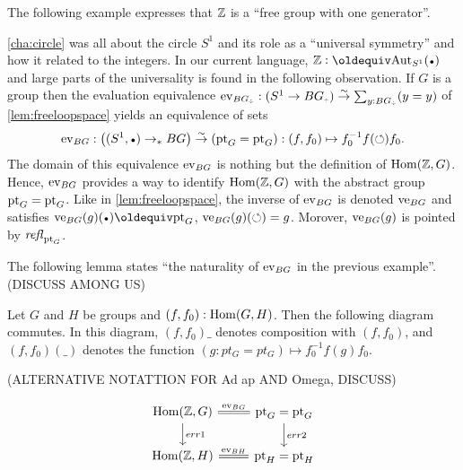 \begin{example}
\end{example}

The following example expresses that $\mathbb{Z}$ is a ``free group with one generator''.

\begin{example}
  \label{ex:Zinitial}
  \cref{cha:circle} was all about the circle $S^1$ and its role as a
  ``universal symmetry'' and how it related to the integers.  In our
  current language, $\ZZ\defequi\aut_{S^1}(\base)$ and large parts of
  the universality is found in the following observation.  If $G$ is a
  group then the evaluation equivalence
  $\ev_{BG_\div}:(S^1\to BG_\div)\we \sum_{y:BG_\div}(y=y)$ of
  \cref{lem:freeloopspace} yields an equivalence of sets
  $$\ev_{BG}:\left((S^1,\base)\ptdto BG\right)\we (\pt_G=\pt_G)
            : (f,f_0)\mapsto f_0^{-1}f(\Sloop)f_0.$$
  The domain of this equivalence $\mathrm{ev}_{BG}$ is nothing but the
  definition of $\mathrm{Hom}(\mathbb{Z},G)$. Hence, $\mathrm{ev}_{BG}$ provides a way to
  identify $\mathrm{Hom}(\mathbb{Z},G)$ with the abstract group $\mathrm{pt}_G=\mathrm{pt}_G$.
Like in \cref{lem:freeloopspace}, the inverse of $\mathrm{ev}_{BG}$
is denoted $\mathrm{ve}_{BG}$ and satisfies $\ve_{BG}(g)(\base)\jdeq\pt_G$, 
$\mathrm{ve}_{BG}(g)(\circlearrowleft)= g$. Morover, $\mathrm{ve}_{BG}(g)$ is pointed by $\mathop{\mathit{refl}_{\mathrm{pt}_G}}$.
\end{example}

The following lemma states ``the naturality of $\mathrm{ev}_{BG}$ in the previous example''.
(DISCUSS AMONG US)

\begin{lemma}\label{lem:Znatural}
Let $G$ and $H$ be groups and $(f,f_0): \mathrm{Hom}(G,H)$.
Then the following diagram commutes. In this diagram,
$(f,f_0)\_$ denotes composition with $(f,f_0)$, and 
$(f,f_0)(\_)$ denotes the function $(g:pt_G = pt_G) \mapsto f_0^{-1} f(g) f_0$.
\end{lemma}
(ALTERNATIVE NOTATTION FOR Ad ap AND Omega, DISCUSS)

\[
\begin{tikzcd} 
\Hom(\ZZ,G) \arrow[r, equal, "\ev_{BG}"] \arrow[d, "err1"] & %
\pt_G = \pt_G \arrow[d, "err2"]\\ %
\Hom(\ZZ,H) \arrow[r, equal, "\ev_{BH}"] & \pt_H = \pt_H \\
\end{tikzcd}
\]

